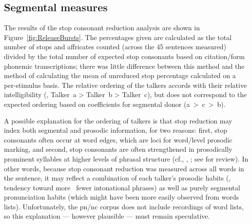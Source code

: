 \subsection{Segmental measures}
The results of the stop consonant reduction analysis are shown in Figure~\ref{fig:ReleaseBursts}.  The percentages given are calculated as the total number of stops and affricates counted (across the 45 sentences measured) divided by the total number of expected stop consonants based on citation\-/form phonemic transcriptions; there was little difference between this method and the method of calculating the mean of unreduced stop percentage calculated on a per-stimulus basis.  The relative ordering of the talkers accords with their relative intelligibility (\ie, Talker~\ac{a} > Talker~\ac{b} > Talker~\ac{c}), but does not correspond to the expected ordering based on coefficients for segmental donor (\ac{a}~>~\ac{c}~>~\ac{b}).  

A possible explanation for the ordering of talkers is that stop reduction may index both segmental and prosodic information, for two reasons: first, stop consonants often occur at word edges, which are loci for word\-/level prosodic marking, and second, stop consonants are often strengthened in prosodically prominent syllables at higher levels of phrasal structure (cf., \eg, \citealt{deJong1995, FougeronKeating1997, ChoEtAl2007, ColeEtAl2007}; see \citealt{Keating2006} for review).  In other words, because stop consonant reduction was measured across all words in the sentence, it may reflect a combination of each talker’s prosodic habits (\ie, tendency toward more \vs\ fewer intonational phrases) as well as purely segmental pronunciation habits (which might have been more easily observed from words lists).  Unfortunately, the \ac{pn/nc} corpus does not include recordings of word lists, so this explanation — however plausible — must remain speculative.

